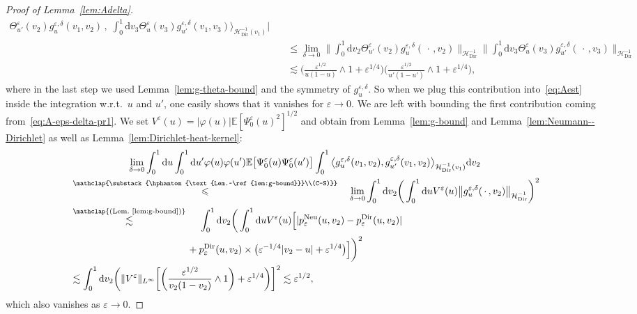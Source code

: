 \documentclass[10pt]{amsart}
\theoremstyle{definition}\newtheorem{defi}[theo]{Definition}\newtheorem{rema}[theo]{Remark}\newtheorem{exam}[theo]{Example}\newtheorem{exem}[theo]{Example}\newtheorem{nota}[theo]{Notation}
\DeclareMathOperator{\Dir}{Dir}
\DeclareMathOperator{\Neu}{Neu}
\newcommand{\mc}[1]{{\mathcal #1}}
\renewcommand{\mc}[1]{{\mathcal #1}}
\renewcommand{\leq}{\leqslant}
\newcommand*{\dd}{\mathrm{d}}
\newcommand*{\du}{\dd u}
\newcommand*{\dv}{\dd v}
\begin{document}
\begin{proof}[Proof of Lemma~\ref{lem:Adelta}]
\begin{align*}
\Theta^{\varepsilon}_{u'} (v_2) g^{\varepsilon, \delta}_u (v_1, v_2)\,,\;
\int_0^1 \dv_3 \Theta^{\varepsilon}_u (v_3) g^{\varepsilon,
\delta}_{u'} (v_1, v_3) \bigg\rangle_{\mc H_{\Dir}^{- 1} (v_1)} \bigg|\\
&\quad \leq \lim_{\delta \rightarrow 0} \bigg\| \int_0^1 \dv_2
\Theta^{\varepsilon}_{u'} (v_2) g^{\varepsilon, \delta}_u (\,\cdot\,, v_2)
\bigg\|_{\mc H_{\Dir}^{- 1}} \bigg\| \int_0^1 \dv_3 \Theta^{\varepsilon}_u (v_3) g^{\varepsilon, \delta}_{u'} (\,\cdot\,, v_3) \bigg\|_{\mc H_{\Dir}^{- 1}}\\
&\quad \lesssim \bigg(\frac{\varepsilon^{1/2}}{u (1 - u)} \wedge 1 + \varepsilon^{1/4} \bigg) \bigg(\frac{\varepsilon^{1/2}}{u' (1 - u')} \wedge 1 + \varepsilon^{1/4} \bigg),
\end{align*}
where in the last step we used Lemma~\ref{lem:g-theta-bound} and the symmetry of $g^{\varepsilon, \delta}_u$. So when we plug this contribution into~\eqref{eq:Aest} inside the integration w.r.t.~$u$ and $u'$, one easily shows that it vanishes for $\varepsilon \rightarrow 0$. We are left with bounding the first contribution coming from~\eqref{eq:A-eps-delta-pr1}. We set $V^{\varepsilon} (u) = |\varphi (u) | \mathbb{E} [\Psi^{\varepsilon}_0 (u)^2]^{1 / 2}$ and obtain from Lemma~\ref{lem:g-bound} and Lemma~\ref{lem:Neumann--Dirichlet} as well as Lemma~\ref{lem:Dirichlet-heat-kernel}:
\begingroup
\allowdisplaybreaks
\begin{multline*}
\lim_{\delta \rightarrow 0} \int_0^1 \du \int_0^1 \du' \varphi (u) \varphi (u') \mathbb{E} \big[\Psi^{\varepsilon}_0 (u)\Psi^{\varepsilon}_0 (u')\big] \int_0^1 \big\langle g^{\varepsilon, \delta}_u (v_1, v_2), g^{\varepsilon, \delta}_{u'} (v_1, v_2) \big\rangle_{\mc H_{\Dir}^{- 1} (v_1)} \dv_2\\
\begin{aligned}
& \overset{\mathclap{\substack{\hphantom{\text{Lem.~\ref{lem:g-bound}}}\\(C-S)}}}{\leq} \quad\lim_{\delta \rightarrow 0} \int_0^1 \dv_2 \bigg(\int_0^1 \du V^{\varepsilon} (u) \big\| g^{\varepsilon,\delta}_u (\,\cdot\,, v_2) \big\|_{\mc H_{\Dir}^{- 1}}\bigg)^2\\
& \overset{\mathclap{\text{(Lem.~\ref{lem:g-bound})}}}{\lesssim}\quad\; \int_0^1 \dv_2 \bigg(\int_0^1 \du V^{\varepsilon} (u) \Big[| p^{\Neu}_{\varepsilon} (u, v_2) - p^{\Dir}_{\varepsilon} (u, v_2) | \\*
& \qquad \qquad \qquad \qquad \qquad \qquad + p^{\Dir}_{\varepsilon} (u, v_2) \times \big(\varepsilon^{- 1/4} | v_2 - u | +
\varepsilon^{1/4} \big)\Big] \bigg)^2\\
& \lesssim \int_0^1 \dv_2 \bigg(\| V^{\varepsilon} \|_{L^{\infty}}
\bigg[\bigg(\frac{\varepsilon^{1/2}}{v_2 (1 - v_2)} \wedge 1 \bigg) +
\varepsilon^{1/4} \bigg) \bigg]^2 \lesssim \varepsilon^{1/2},
\end{aligned}
\end{multline*}
which also vanishes as $\varepsilon \rightarrow 0$.
\end{proof}
\endgroup
\end{document}

